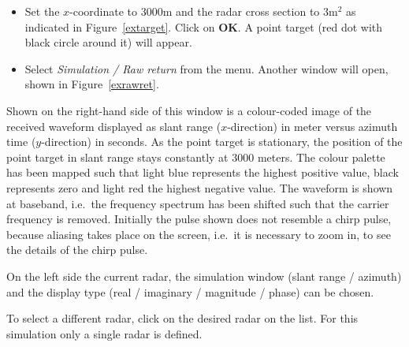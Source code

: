 
\begin{itemize}
\item  Set the $x$-coordinate to $3000$\thinspace m and the radar cross
section to $3$\thinspace m$^{2}$ as indicated in Figure~\ref{extarget}.
Click on \textbf{OK}. A point target (red dot with black circle around it)
will appear.

\item  Select \textit{Simulation / Raw return} from the menu. Another window
will open, shown in Figure~\ref{exrawret}.
\end{itemize}


Shown on the right-hand side of this window is a colour-coded image of the
received waveform displayed as slant range ($x$-direction) in meter versus
azimuth time ($y$-direction) in seconds. As the point target is stationary,
the position of the point target in slant range stays constantly at $3000$
meters. The colour palette has been mapped such that light blue represents
the highest positive value, black represents zero and light red the highest
negative value. The waveform is shown at baseband, i.e.~the frequency
spectrum has been shifted such that the carrier frequency is removed.
Initially the pulse shown does not resemble a chirp pulse, because aliasing
takes place on the screen, i.e.~it is necessary to zoom in, to see the
details of the chirp pulse.

On the left side the current radar, the simulation window (slant range /
azimuth) and the display type (real / imaginary / magnitude / phase) can be
chosen.

To select a different radar, click on the desired radar on the list. For
this simulation only a single radar is defined.


